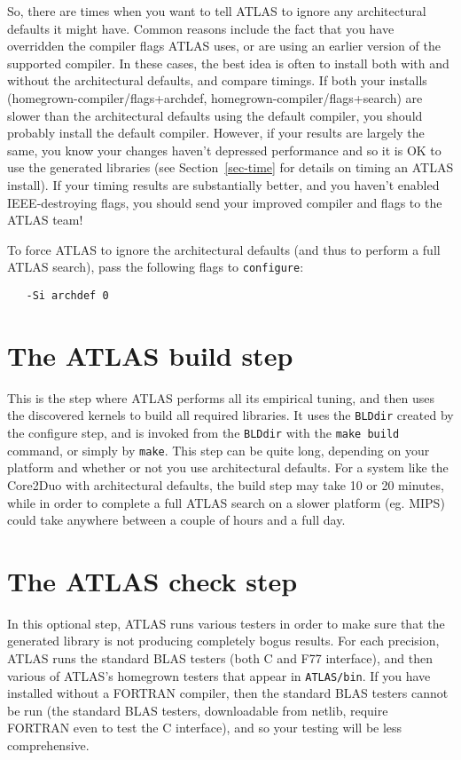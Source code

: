 \documentclass[11pt]{article}
\begin{document}
So, there are times when you want to tell ATLAS to ignore any architectural
defaults it might have.  Common reasons include the fact that you have
overridden the compiler flags ATLAS uses, or are using an earlier version
of the supported compiler.  In these cases, the best idea is often to
install both with and without the architectural defaults, and compare timings.
If both your installs (homegrown-compiler/flags+archdef, 
homegrown-compiler/flags+search) are slower than the architectural defaults
using the default compiler, you should probably install the default 
compiler.  However, if your results are largely the same, you know your
changes haven't depressed performance and so it is OK to use the generated
libraries (see Section~\ref{sec-time} for details on timing an ATLAS
install).  If your timing results are substantially better, and you haven't
enabled IEEE-destroying flags, you should send your improved compiler and
flags to the ATLAS team!

To force ATLAS to ignore the architectural defaults (and thus to perform
a full ATLAS search), pass the following flags to {\tt configure}:
\begin{verbatim}
   -Si archdef 0
\end{verbatim}

\section{The ATLAS build step}
\label{sec-build}

This is the step where ATLAS performs all its empirical tuning, and then
uses the discovered kernels to build all required libraries.  It uses
the {\tt BLDdir} created by the configure step, and is invoked from
the {\tt BLDdir} with the {\tt make build} command, or simply by {\tt make}.
This step can be quite long, depending on your platform and whether or
not you use architectural defaults.  For a system like the Core2Duo with
architectural defaults, the build step may take 10 or 20 minutes, while in
order to complete a full ATLAS search on a slower platform (eg. MIPS) could
take anywhere between a couple of hours and a full day.

\section{The ATLAS check step}
\label{sec-check}
In this optional step, ATLAS runs various testers in order to make sure
that the generated library is not producing completely bogus results.
For each precision, ATLAS runs the standard BLAS testers (both C and F77
interface), and then various of ATLAS's homegrown testers that appear
in {\tt ATLAS/bin}.  If you have installed without a FORTRAN compiler,
then the standard BLAS testers cannot be run (the standard BLAS testers,
downloadable from netlib, require FORTRAN even to test the C interface),
and so your testing will be less comprehensive.
\end{document}
